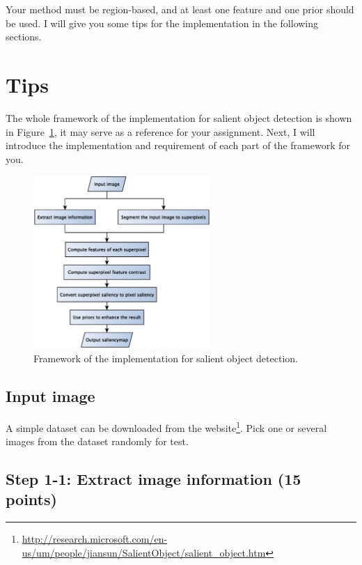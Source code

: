 \documentclass[12pt]{article}
\begin{document}
Your method must be region-based, and at least one feature and one prior should be used. I will give you some tips for the implementation in the following sections.

\section{Tips}

The whole framework of the implementation for salient object detection is shown in Figure~\ref{fig: framework}, it may serve as a reference for your assignment. Next, I will introduce the implementation and requirement of each part of the framework for you.

\begin{figure}[!ht]
\centering
\includegraphics[width=0.6\textwidth]{framework.eps}
\caption{Framework of the implementation for salient object detection.}
\label{fig: framework}
\end{figure}

\subsection{Input image}

A simple dataset can be downloaded from the website\footnote{\url{http://research.microsoft.com/en-us/um/people/jiansun/SalientObject/salient_object.htm}}. Pick one or several images from the dataset randomly for test.

\subsection{Step 1-1: Extract image information (15 points)}
\end{document}
